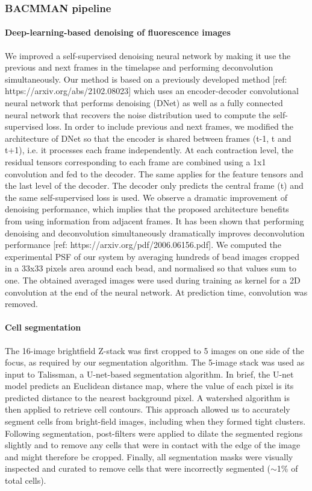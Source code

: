 \subsubsection*{BACMMAN pipeline}
\paragraph*{Deep-learning-based denoising of fluorescence images}
We improved a self-supervised denoising neural network by making it use the previous and next frames in the timelapse and performing deconvolution simultaneously. Our method is based on a previously developed method [ref: https://arxiv.org/abs/2102.08023] which uses an encoder-decoder convolutional neural network that performs denoising (DNet) as well as a fully connected neural network that recovers the noise distribution used to compute the self-supervised loss. In order to include previous and next frames, we modified the architecture of DNet so that the encoder is shared between frames (t-1, t and t+1), i.e. it processes each frame independently. At each contraction level, the residual tensors corresponding to each frame are combined using a 1x1 convolution and fed to the decoder. The same applies for the feature tensors and the last level of the decoder. The decoder only predicts the central frame (t) and the same self-supervised loss is used. We observe a dramatic improvement of denoising performance, which implies that the proposed architecture benefits from using information from adjacent frames. It has been shown that performing denoising and deconvolution simultaneously dramatically improves deconvolution performance [ref: https://arxiv.org/pdf/2006.06156.pdf]. We computed the experimental PSF of our system by averaging hundreds of bead images cropped in a 33x33 pixels area around each bead, and normalised so that values sum to one. The obtained averaged images were used during training as kernel for a 2D convolution at the end of the neural network. At prediction time, convolution was removed.

\paragraph{Cell segmentation}
The 16-image brightfield Z-stack was first cropped to 5 images on one side of the focus, as required by our segmentation algorithm. The 5-image stack was used as input to Talissman, a U-net-based segmentation algorithm. In brief, the U-net model predicts an Euclidean distance map, where the value of each pixel is its predicted distance to the nearest background pixel. A watershed algorithm is then applied to retrieve cell contours. This approach allowed us to accurately segment cells from bright-field images, including when they formed tight clusters. Following segmentation, post-filters were applied to dilate the segmented regions slightly and to remove any cells that were in contact with the edge of the image and might therefore be cropped. Finally, all segmentation masks were visually inspected and curated to remove cells that were incorrectly segmented ($\sim$1\% of total cells).

